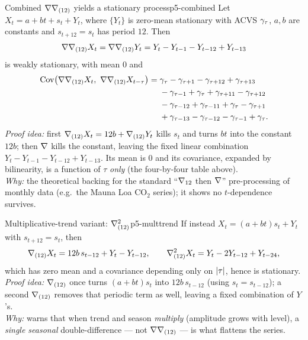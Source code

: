 \begin{theorem}{Combined $\nabla\nabla_{(12)}$ yields a stationary process}{p5-combined}
Let $X_t=a+bt+s_t+Y_t$, where $\{Y_t\}$ is zero-mean stationary with ACVS
$\gamma_\tau$, $a,b$ are constants and $s_{t+12}=s_t$ has period $12$. Then
\[
\nabla\nabla_{(12)}X_t=\nabla\nabla_{(12)}Y_t
=Y_t-Y_{t-1}-Y_{t-12}+Y_{t-13}
\]
is weakly stationary, with mean $0$ and
\[
\begin{aligned}
\operatorname{Cov}\bigl(\nabla\nabla_{(12)}X_t,\ \nabla\nabla_{(12)}X_{t-\tau}\bigr)
=\;&\gamma_\tau-\gamma_{\tau+1}-\gamma_{\tau+12}+\gamma_{\tau+13}\\
&-\gamma_{\tau-1}+\gamma_{\tau}+\gamma_{\tau+11}-\gamma_{\tau+12}\\
&-\gamma_{\tau-12}+\gamma_{\tau-11}+\gamma_{\tau}-\gamma_{\tau+1}\\
&+\gamma_{\tau-13}-\gamma_{\tau-12}-\gamma_{\tau-1}+\gamma_{\tau} .
\end{aligned}
\]
\textit{Proof idea:} first $\nabla_{(12)}X_t=12b+\nabla_{(12)}Y_t$ kills $s_t$ and
turns $bt$ into the constant $12b$; then $\nabla$ kills the constant, leaving the
fixed linear combination $Y_t-Y_{t-1}-Y_{t-12}+Y_{t-13}$. Its mean is $0$ and
its covariance, expanded by bilinearity, is a function of $\tau$ \emph{only}
(the four-by-four table above).\\
\textit{Why:} the theoretical backing for the standard ``$\nabla_{12}$ then
$\nabla$'' pre-processing of monthly data (e.g.\ the Mauna Loa $\mathrm{CO}_2$
series); it shows no $t$-dependence survives.
\end{theorem}

\begin{proposition}{Multiplicative-trend variant: $\nabla_{(12)}^{2}$}{p5-multtrend}
If instead $X_t=(a+bt)s_t+Y_t$ with $s_{t+12}=s_t$, then
\[
\nabla_{(12)}X_t=12b\,s_{t-12}+Y_t-Y_{t-12},
\qquad
\nabla_{(12)}^{2}X_t=Y_t-2Y_{t-12}+Y_{t-24},
\]
which has zero mean and a covariance depending only on $\left\lvert \tau \right\rvert$, hence is
stationary.\\[2pt]
\textit{Proof idea:} $\nabla_{(12)}$ once turns $(a+bt)s_t$ into $12b\,s_{t-12}$
(using $s_t=s_{t-12}$); a second $\nabla_{(12)}$ removes that periodic term as
well, leaving a fixed combination of $Y$'s.\\
\textit{Why:} warns that when trend and season \emph{multiply} (amplitude grows
with level), a \emph{single seasonal} double-difference --- not
$\nabla\nabla_{(12)}$ --- is what flattens the series.
\end{proposition}

